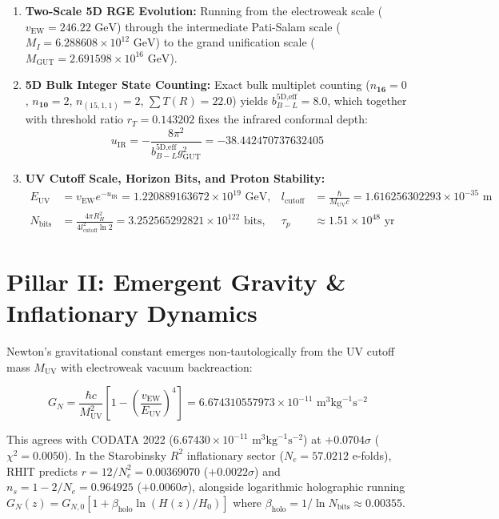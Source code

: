 \documentclass[11pt, a4paper]{article}
\begin{document}
\begin{enumerate}
    \item \textbf{Two-Scale 5D RGE Evolution:} Running from the electroweak scale ($v_{\text{EW}} = 246.22\text{ GeV}$) through the intermediate Pati-Salam scale ($M_I = 6.288608 \times 10^{12}\text{ GeV}$) to the grand unification scale ($M_{\text{GUT}} = 2.691598 \times 10^{16}\text{ GeV}$).
    \item \textbf{5D Bulk Integer State Counting:} Exact bulk multiplet counting ($n_{\mathbf{16}} = 0$, $n_{\mathbf{10}} = 2$, $n_{(15,1,1)} = 2$, $\sum T(R) = 22.0$) yields $b_{B-L}^{5\text{D,eff}} = 8.0$, which together with threshold ratio $r_T = 0.143202$ fixes the infrared conformal depth:
    \begin{equation}
    u_{\text{IR}} = -\frac{8\pi^2}{b_{B-L}^{5\text{D,eff}} g_{\text{GUT}}^2} = -38.442470737632405
    \end{equation}
    \item \textbf{UV Cutoff Scale, Horizon Bits, and Proton Stability:}
    \begin{align}
    E_{\text{UV}} &= v_{\text{EW}} e^{-u_{\text{IR}}} = 1.220889163672 \times 10^{19}\text{ GeV}, &
    l_{\text{cutoff}} &= \frac{\hbar}{M_{\text{UV}} c} = 1.616256302293 \times 10^{-35}\text{ m} \\
    N_{\text{bits}} &= \frac{4\pi R_H^2}{4 l_{\text{cutoff}}^2 \ln 2} = 3.252565292821 \times 10^{122}\text{ bits}, &
    \tau_p &\approx 1.51 \times 10^{48}\text{ yr}
    \end{align}
\end{enumerate}

\section{Pillar II: Emergent Gravity \& Inflationary Dynamics}

Newton's gravitational constant emerges non-tautologically from the UV cutoff mass $M_{\text{UV}}$ with electroweak vacuum backreaction:

\begin{equation}
G_N = \frac{\hbar c}{M_{\text{UV}}^2} \left[ 1 - \left(\frac{v_{\text{EW}}}{E_{\text{UV}}}\right)^4 \right] = 6.674310557973 \times 10^{-11}\text{ m}^3\text{kg}^{-1}\text{s}^{-2}
\end{equation}

This agrees with CODATA 2022 ($6.67430 \times 10^{-11}\text{ m}^3\text{kg}^{-1}\text{s}^{-2}$) at $+0.0704\sigma$ ($\chi^2 = 0.0050$). In the Starobinsky $R^2$ inflationary sector ($N_e = 57.0212$ e-folds), RHIT predicts $r = 12/N_e^2 = 0.00369070$ ($+0.0022\sigma$) and $n_s = 1 - 2/N_e = 0.964925$ ($+0.0060\sigma$), alongside logarithmic holographic running $G_N(z) = G_{N,0}[1 + \beta_{\text{holo}}\ln(H(z)/H_0)]$ where $\beta_{\text{holo}} = 1/\ln N_{\text{bits}} \approx 0.00355$.
\end{document}
